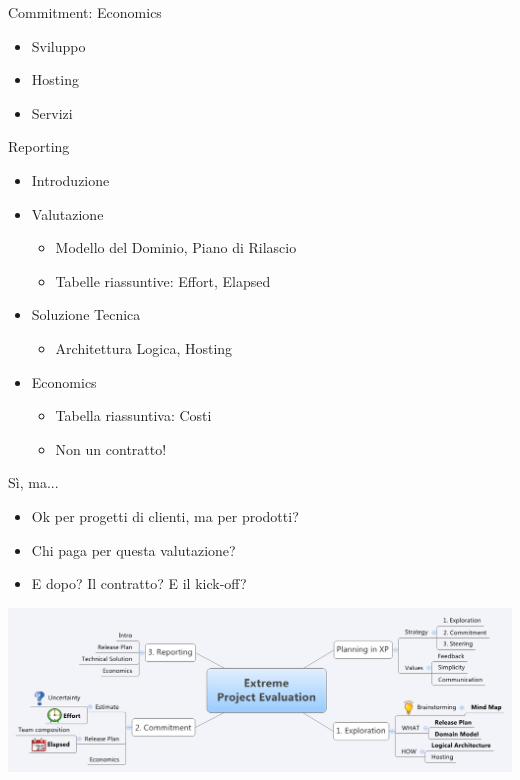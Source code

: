 \documentclass[compress, red, 14pt]{beamer}
\begin{document}
	\begin{frame}{Commitment: Economics}
		\begin{itemize}
			\item Sviluppo
			\item Hosting
			\item Servizi
		\end{itemize}

	\end{frame}
	
	\begin{frame}{Reporting}
		\begin{itemize}
			\item Introduzione
			\item Valutazione
			\begin{itemize}
				\item Modello del Dominio, Piano di Rilascio
				\item Tabelle riassuntive: Effort, Elapsed
			\end{itemize}
			\item Soluzione Tecnica
			\begin{itemize}
				\item Architettura Logica, Hosting
			\end{itemize}
			\item Economics
			\begin{itemize}
				\item Tabella riassuntiva: Costi
				\item Non un contratto!
			\end{itemize}
		\end{itemize}
	\end{frame}
	
	\begin{frame}{Sì, ma...}
		\begin{itemize}
			\item Ok per progetti di clienti, ma per prodotti?
			\item Chi paga per questa valutazione?
			\item E dopo? Il contratto? E il kick-off?
		\end{itemize}
		\begin{center}
			\includegraphics[scale=0.28]{images/takeaway.png}
		\end{center}
	\end{frame}
	
\end{document}

